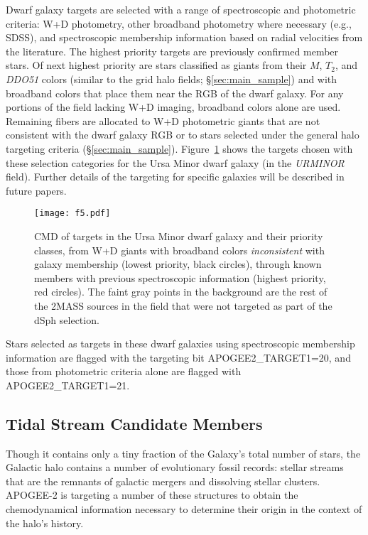 \documentclass[12pt,twocolumn]{emulateapj}
\begin{document}
Dwarf galaxy targets are selected with a range of spectroscopic and photometric criteria: W+D photometry, other broadband photometry where necessary (e.g., SDSS), and spectroscopic membership information based on radial velocities from the literature.  The highest priority targets are previously confirmed member stars.  Of next highest priority are stars classified as giants from their $M$, $T_2$, and {\it DDO51} colors (similar to the grid halo fields; \S\ref{sec:main_sample}) and with broadband colors that place them near the RGB of the dwarf galaxy.  For any portions of the field lacking W+D imaging, broadband colors alone are used.  
Remaining fibers are allocated to W+D photometric giants that are not consistent with the dwarf galaxy RGB or to stars selected under the general halo targeting criteria (\S\ref{sec:main_sample}). 
Figure~\ref{fig:dsphcmd} shows the targets chosen with these selection categories for the Ursa Minor dwarf galaxy (in the {\it URMINOR} field).
Further details of the targeting for specific galaxies will be described in future papers.

\begin{figure}[!hptb]
\begin{center}
\texttt{[image: f5.pdf]} %
\caption{
CMD of targets in the Ursa Minor dwarf galaxy and their priority classes, from W+D giants with broadband colors {\it inconsistent} with galaxy membership (lowest priority, black circles), through known members with previous spectroscopic information (highest priority, red circles).  The faint gray points in the background are the rest of the 2MASS sources in the field that were not targeted as part of the dSph selection.
}
\label{fig:dsphcmd}
\end{center}
\end{figure}


Stars selected as targets in these dwarf galaxies using 
spectroscopic membership information are flagged with the targeting bit APOGEE2\_TARGET1=20, and those from photometric criteria alone are flagged with APOGEE2\_TARGET1=21.  

\subsection{Tidal Stream Candidate Members}
\label{sec:tidal_streams}

Though it contains only a tiny fraction of the Galaxy's total number of stars, the Galactic halo contains a number of evolutionary fossil records: stellar streams that are the remnants of galactic mergers and dissolving stellar clusters.  APOGEE-2 is targeting a number of these structures to obtain the chemodynamical information necessary to determine their origin in the context of the halo's history.
\end{document}

